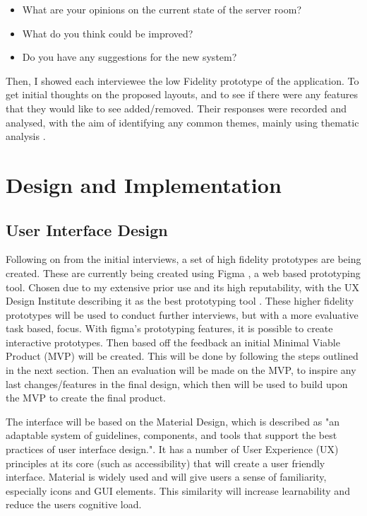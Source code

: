 \documentclass [11pt,a4paper]{article}
\begin{document}
\begin{itemize}
    \item What are your opinions on the current state of the server room?
    \item What do you think could be improved?
    \item Do you have any suggestions for the new system?
\end{itemize}

Then, I showed each interviewee the low Fidelity prototype of the application. To get initial thoughts on the  proposed layouts, and to see if there were any features that they would like to see added/removed. Their responses were recorded and analysed, with the aim of identifying any common themes, mainly using thematic analysis \cite{thematicAnal}.

\section{Design and Implementation}
\label{sec:design}
\subsection{User Interface Design}
\label{sec:ui_design}
Following on from the initial interviews, a set of high fidelity prototypes are being created. These are currently being created using Figma \cite{figma}, a web based prototyping tool. Chosen due to my extensive prior use and its high reputability, with the UX Design Institute describing it as the best prototyping tool \cite{figmaUX}. These higher fidelity prototypes will be used to conduct further interviews, but with a more evaluative task based, focus. With figma's prototyping features, it is possible to create interactive prototypes. Then based off the feedback an initial Minimal Viable Product (MVP) will be created. This will be done by following the steps outlined in the next section. Then an evaluation will be made on the MVP, to inspire any last changes/features in the final design, which then will be used to build upon the MVP to create the final product.

The interface will be based on the Material Design, which is described as "an adaptable system of guidelines, components, and tools that support the best practices of user interface design."\cite{materialDesign}. It has a number of User Experience (UX) principles at its core (such as accessibility) that will create a user friendly interface. Material is widely used and will give users a sense of familiarity, especially icons and GUI elements. This similarity will increase learnability and reduce the users cognitive load.
\end{document}
